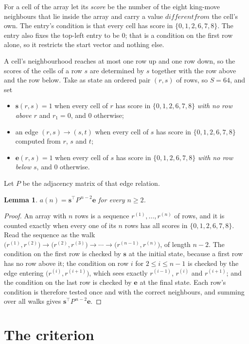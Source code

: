 \documentclass[11pt,a4paper]{article}
\theoremstyle{plain}
\newtheorem{lemma}[theorem]{Lemma}
\theoremstyle{definition}
\begin{document}
For a cell of the array let its \emph{score} be the number of the eight king-move neighbours that lie inside
the array and carry a value $different from$ the cell's own. The entry's condition is that every cell
has score in $\{0,1,2,6,7,8\}$. The entry also fixes the top-left entry to be $0$; that is a condition on the first row alone, so it restricts the start vector and nothing else.

A cell's neighbourhood reaches at most one row up and one row down, so the scores of the
cells of a row $s$ are determined by $s$ together with the row above and the row below.
Take as state an ordered pair $(r,s)$ of rows, so $S=64$, and set
\begin{itemize}
\item $\mathbf{s}(r,s)=1$ when every cell of $r$ has score in $\{0,1,2,6,7,8\}$ \emph{with no row
above $r$} and $r_1=0$, and $0$ otherwise;
\item an edge $(r,s)\to(s,t)$ when every cell of $s$ has score in $\{0,1,2,6,7,8\}$ computed from
$r$, $s$ and $t$;
\item $\mathbf{e}(r,s)=1$ when every cell of $s$ has score in $\{0,1,2,6,7,8\}$ \emph{with no row
below $s$}, and $0$ otherwise.
\end{itemize}
Let $P$ be the adjacency matrix of that edge relation.

\begin{lemma}\label{lem:walk}
$a(n)=\mathbf{s}^{\!\top}P^{\,n-2}\mathbf{e}$ for every $n\ge2$.
\end{lemma}

\begin{proof}
An array with $n$ rows is a sequence $r^{(1)},\dots,r^{(n)}$ of rows, and it is counted
exactly when every one of its $n$ rows has all scores in $\{0,1,2,6,7,8\}$. Read the sequence as the
walk $\bigl(r^{(1)},r^{(2)}\bigr)\to\bigl(r^{(2)},r^{(3)}\bigr)\to\cdots\to
\bigl(r^{(n-1)},r^{(n)}\bigr)$, of length $n-2$. The condition on the first row is
checked by $\mathbf{s}$ at the initial state, because a first row has no row above it; the
condition on row $i$ for $2\le i\le n-1$ is checked by the edge entering
$\bigl(r^{(i)},r^{(i+1)}\bigr)$, which sees exactly $r^{(i-1)}$, $r^{(i)}$ and
$r^{(i+1)}$; and the condition on the last row is checked by $\mathbf{e}$ at the final
state. Each row's condition is therefore tested once and with the correct neighbours, and
summing over all walks gives $\mathbf{s}^{\!\top}P^{\,n-2}\mathbf{e}$.
\end{proof}

\section{The criterion}
\end{document}
